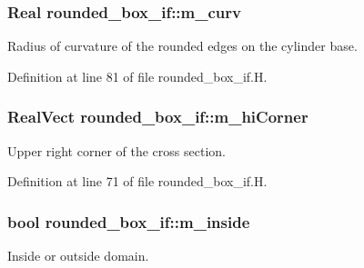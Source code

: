 \subsubsection[{\texorpdfstring{m\+\_\+curv}{m_curv}}]{\setlength{\rightskip}{0pt plus 5cm}Real rounded\+\_\+box\+\_\+if\+::m\+\_\+curv\hspace{0.3cm}{\ttfamily [protected]}}\hypertarget{classrounded__box__if_a488e9171cb2e146a87ae4cd8250c9827}{}\label{classrounded__box__if_a488e9171cb2e146a87ae4cd8250c9827}


Radius of curvature of the rounded edges on the cylinder base. 



Definition at line 81 of file rounded\+\_\+box\+\_\+if.\+H.

\subsubsection[{\texorpdfstring{m\+\_\+hi\+Corner}{m_hiCorner}}]{\setlength{\rightskip}{0pt plus 5cm}Real\+Vect rounded\+\_\+box\+\_\+if\+::m\+\_\+hi\+Corner\hspace{0.3cm}{\ttfamily [protected]}}\hypertarget{classrounded__box__if_ab98867b89d6efc596c1dd7e6436076f2}{}\label{classrounded__box__if_ab98867b89d6efc596c1dd7e6436076f2}


Upper right corner of the cross section. 



Definition at line 71 of file rounded\+\_\+box\+\_\+if.\+H.

\subsubsection[{\texorpdfstring{m\+\_\+inside}{m_inside}}]{\setlength{\rightskip}{0pt plus 5cm}bool rounded\+\_\+box\+\_\+if\+::m\+\_\+inside\hspace{0.3cm}{\ttfamily [protected]}}\hypertarget{classrounded__box__if_ab7b1242564fcc136597c886d631eeca8}{}\label{classrounded__box__if_ab7b1242564fcc136597c886d631eeca8}


Inside or outside domain. 



